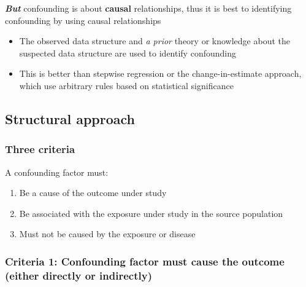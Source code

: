\documentclass[
]{book}
\providecommand{\tightlist}{%
  \setlength{\itemsep}{0pt}\setlength{\parskip}{0pt}}
\begin{document}
\textbf{\emph{But}} confounding is about \textbf{causal} relationships, thus it is best to identifying confounding by using causal relationships

\begin{itemize}
\tightlist
\item
  The observed data structure and \emph{a prior} theory or knowledge about the suspected data structure are used to identify confounding
\item
  This is better than stepwise regression or the change-in-estimate approach, which use arbitrary rules based on statistical significance
\end{itemize}

\hypertarget{structural-approach}{%
\subsection{Structural approach}\label{structural-approach}}

\hypertarget{three-criteria}{%
\subsubsection{Three criteria}\label{three-criteria}}

A confounding factor must:

\begin{enumerate}
\def\labelenumi{\arabic{enumi}.}
\tightlist
\item
  Be a cause of the outcome under study
\item
  Be associated with the exposure under study in the source population
\item
  Must not be caused by the exposure or disease
\end{enumerate}

\hypertarget{criteria-1-confounding-factor-must-cause-the-outcome-either-directly-or-indirectly}{%
\subsubsection{Criteria 1: Confounding factor must cause the outcome (either directly or indirectly)}\label{criteria-1-confounding-factor-must-cause-the-outcome-either-directly-or-indirectly}}
\end{document}
